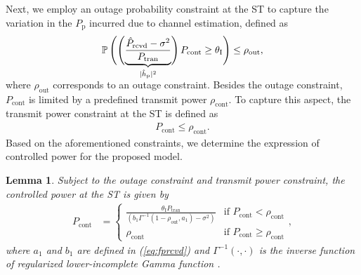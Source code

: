 \documentclass[12pt, draftclsnofoot, onecolumn]{IEEEtran}
\newcommand{\p}{\mathbb P}
\newcommand{\sub}[1]{_{\text{#1}}}
\newcommand{\opc}{\rho\sub{out}}
\newcommand{\pc}{\rho\sub{cont}}
\newcommand{\preg}{P\sub{cont}}
\newcommand{\prcvd}{P\sub{rcvd}}
\newcommand{\eprcvd}{\hat{P}\sub{rcvd}}
\newcommand{\ptran}{P\sub{tran}}
\newcommand{\pp}{P\sub{p}}
\newcommand{\ite}{\theta\sub{I}}
\newcommand{\rs}{R\sub{s}}
\newcommand{\gp}{h\sub{p}}
\newcommand{\epgp}{|\hat{h}\sub{p}|^2}
\newcommand{\gs}{h\sub{s}}
\newcommand{\nps}{\sigma^2}
\newtheorem{lemma}{Lemma}
\begin{document}
Next, we employ an outage probability constraint at the ST to capture the variation in the $\pp$ incurred due to channel estimation, defined as 
\begin{align}
\p\left( \left( \smash[b]{\underbrace{\frac{\eprcvd - \nps}{\ptran}}_{\epgp}} \right) \preg \ge \ite \right) \le \opc, \label{eq:opc} \\[-1em] \nonumber 
\end{align}
where $\opc$ corresponds to an outage constraint. 
Besides the outage constraint, $\preg$ is limited by a predefined transmit power $\pc$. To capture this aspect, the transmit power constraint at the ST is defined as
\begin{align}
\preg \le \pc. \label{eq:pc} 
\end{align} 
Based on the aforementioned constraints, we determine the expression of controlled power for the proposed model.
\begin{lemma} \label{lm:lm3}
Subject to the outage constraint and transmit power constraint, the controlled power at the ST is given by
\begin{align}
\preg &= 
\begin{cases} 
\frac{\ite \ptran}{ \left(b_1 \Gamma^{-1}(1-\opc, a_1) - \nps  \right)} & \mbox{if } \preg < \pc \\
\pc & \mbox{if } \preg \ge \pc
\end{cases},
\label{eq:preg} 
\end{align}
where $a_1$ and $b_1$ are defined in (\ref{eq:fprcvd}) and $\Gamma^{-1}(\cdot, \cdot)$ is the inverse function of regularized lower-incomplete Gamma function \cite{abramo}.
\end{lemma} 
\end{document}
